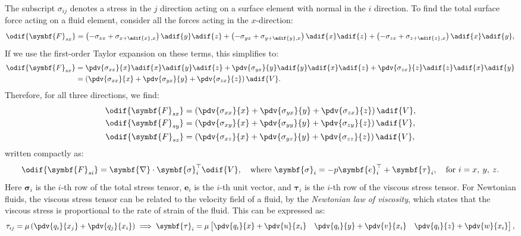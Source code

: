 \documentclass{article}
\theoremstyle{definition}
\begin{document}
The subscript \(\sigma_{ij}\) denotes a stress in the \(j\) direction
acting on a surface element with normal in the \(i\) direction. To find
the total surface force acting on a fluid element, consider all the
forces acting in the \(x\)-direction:
\begin{equation*}
    \odif{\symbf{F}_{sx}} = \left( - \sigma_{xx} + \sigma_{x+\adif{x},x} \right) \adif{y} \adif{z} + \left( - \sigma_{yx} + \sigma_{y+\adif{y},x} \right) \adif{x} \adif{z} + \left( - \sigma_{zx} + \sigma_{z+\adif{z},x} \right) \adif{x} \adif{y},
\end{equation*}
If we use the first-order Taylor expansion on these terms, this
simplifies to:
\begin{align*}
    \odif{\symbf{F}_{sx}} & = \pdv{\sigma_{xx}}{x} \adif{x} \adif{y} \adif{z} + \pdv{\sigma_{yx}}{y} \adif{y} \adif{x} \adif{z} + \pdv{\sigma_{zx}}{z} \adif{z} \adif{x} \adif{y} \\
                          & = \left( \pdv{\sigma_{xx}}{x} + \pdv{\sigma_{yx}}{y} + \pdv{\sigma_{zx}}{z} \right) \adif{V}.
\end{align*}
Therefore, for all three directions, we find:
\begin{align*}
    \odif{\symbf{F}_{sx}} & = \left( \pdv{\sigma_{xx}}{x} + \pdv{\sigma_{yx}}{y} + \pdv{\sigma_{zx}}{z} \right) \adif{V}, \\
    \odif{\symbf{F}_{sy}} & = \left( \pdv{\sigma_{xy}}{x} + \pdv{\sigma_{yy}}{y} + \pdv{\sigma_{zy}}{z} \right) \adif{V}, \\
    \odif{\symbf{F}_{sz}} & = \left( \pdv{\sigma_{xz}}{x} + \pdv{\sigma_{yz}}{y} + \pdv{\sigma_{zz}}{z} \right) \adif{V},
\end{align*}
written compactly as:
\begin{equation*}
    \odif{\symbf{F}_{si}} = \symbf{\nabla} \cdot \symbf{\sigma}_i^\top \odif{V}, \quad \text{where } \symbf{\sigma}_i = -p \symbf{e}_i^\top + \symbf{\tau}_i, \quad \text{for } i = x,\: y,\: z.
\end{equation*}
Here \(\symbf{\sigma}_i\) is the \(i\)-th row of the total stress tensor,
\(\symbf{e}_i\) is the \(i\)-th unit vector, and \(\symbf{\tau}_i\) is
the \(i\)-th row of the viscous stress tensor.
For Newtonian fluids, the viscous stress tensor can be related to the
velocity field of a fluid, by the \textit{Newtonian law of viscosity},
which states that the viscous stress is proportional to the rate of
strain of the fluid. This can be expressed as:
\begin{equation*}
    \tau_{ij} = \mu \left( \pdv{q_i}{x_j} + \pdv{q_j}{x_i} \right) \implies \symbf{\tau}_i = \mu
    \begin{bmatrix}
        \displaystyle \pdv{q_i}{x} + \pdv{u}{x_i} &
        \displaystyle \pdv{q_i}{y} + \pdv{v}{x_i} &
        \displaystyle \pdv{q_i}{z} + \pdv{w}{x_i}
    \end{bmatrix},
\end{equation*}
\end{document}
